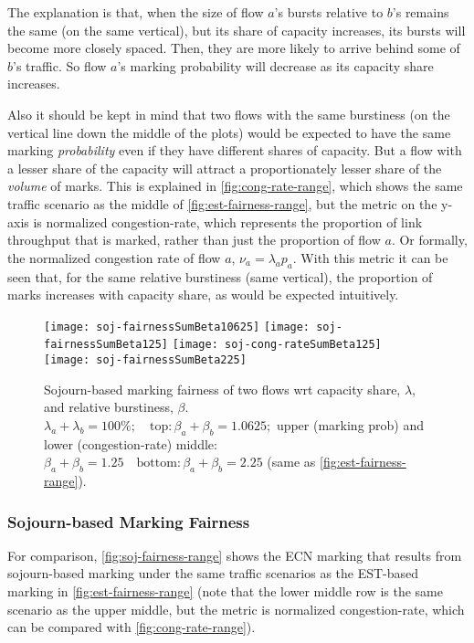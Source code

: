The explanation is that, when the size of flow \(a\)'s bursts relative to \(b\)'s remains the same (on the same vertical), but its share of capacity increases, its bursts will become more closely spaced. Then, they are more likely to arrive behind some of \(b\)'s traffic. So flow \(a\)'s marking probability will decrease as its capacity share increases.

Also it should be kept in mind that two flows with the same burstiness (on the vertical line down the middle of the plots) would be expected to have the same marking \emph{probability} even if they have different shares of capacity. But a flow with a lesser share of the capacity will attract a proportionately lesser share of the \emph{volume} of marks. This is explained in \autoref{fig:cong-rate-range}, which shows the same traffic scenario as the middle of \autoref{fig:est-fairness-range}, but the metric on the y-axis is normalized congestion-rate, which represents the proportion of link throughput that is marked, rather than just the proportion of flow \(a\). Or formally, the normalized congestion rate of flow \(a\), \(\nu_a = \lambda_a p_a\). With this metric it can be seen that, for the same relative burstiness (same vertical), the proportion of marks increases with capacity share, as would be expected intuitively.

\begin{figure*}
	\centering
	\texttt{[image: soj-fairnessSumBeta10625]}
	\texttt{[image: soj-fairnessSumBeta125]}
	\texttt{[image: soj-cong-rateSumBeta125]}
	\texttt{[image: soj-fairnessSumBeta225]}
	\caption{Sojourn-based marking fairness of two flows wrt capacity share, \(\lambda\), and relative burstiness, \(\beta\).\\
		\(\lambda_a+\lambda_b=100\%; \quad\mathrm{top:} \beta_a+\beta_b=1.0625;\) upper (marking prob) and lower (congestion-rate) middle: \(\beta_a+\beta_b=1.25 
		\quad\mathrm{bottom:} \beta_a+\beta_b=2.25\) (same as \autoref{fig:est-fairness-range}). 
}\label{fig:soj-fairness-range}
\end{figure*}

\subsubsection{Sojourn-based Marking Fairness}\label{sec:marking_fairness_expts_soj}

For comparison, \autoref{fig:soj-fairness-range} shows the ECN marking that results from sojourn-based marking under the same traffic scenarios as the EST-based marking in \autoref{fig:est-fairness-range} (note that the lower middle row is the same scenario as the upper middle, but the metric is normalized congestion-rate, which can be compared with \autoref{fig:cong-rate-range}).

